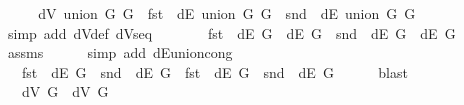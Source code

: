 \begin{isabellebody}
%
\isadelimproof
%
\endisadelimproof
%
\isatagproof
{}\isamarkupfalse%
\ {\isacharminus}{\kern0pt}\isanewline
\ \ \isamarkupfalse%
\ {\isachardoublequoteopen}dV\ {\isacharparenleft}{\kern0pt}union\ G{}\ G{}{\isacharparenright}{\kern0pt}\ {\isacharequal}{\kern0pt}\ fst\ {\isacharbackquote}{\kern0pt}\ dE\ {\isacharparenleft}{\kern0pt}union\ G{}\ G{}{\isacharparenright}{\kern0pt}\ {\isasymunion}\ snd\ {\isacharbackquote}{\kern0pt}\ dE\ {\isacharparenleft}{\kern0pt}union\ G{}\ G{}{\isacharparenright}{\kern0pt}{\isachardoublequoteclose}\isanewline
\ \ \ \ \isamarkupfalse%
\ {\isacharparenleft}{\kern0pt}simp\ add{\isacharcolon}{\kern0pt}\ dV{\isacharunderscore}{\kern0pt}def\ dVs{\isacharunderscore}{\kern0pt}eq{\isacharparenright}{\kern0pt}\isanewline
\ \ \isamarkupfalse%
\ \isamarkupfalse%
\ {\isachardoublequoteopen}{\isachardot}{\kern0pt}{\isachardot}{\kern0pt}{\isachardot}{\kern0pt}\ {\isacharequal}{\kern0pt}\ fst\ {\isacharbackquote}{\kern0pt}\ {\isacharparenleft}{\kern0pt}dE\ G{}\ {\isasymunion}\ dE\ G{}{\isacharparenright}{\kern0pt}\ {\isasymunion}\ snd\ {\isacharbackquote}{\kern0pt}\ {\isacharparenleft}{\kern0pt}dE\ G{}\ {\isasymunion}\ dE\ G{}{\isacharparenright}{\kern0pt}{\isachardoublequoteclose}\isanewline
\ \ \ \ \isamarkupfalse%
\ assms\isanewline
\ \ \ \ \isamarkupfalse%
\ {\isacharparenleft}{\kern0pt}simp\ add{\isacharcolon}{\kern0pt}\ dE{\isacharunderscore}{\kern0pt}union{\isacharunderscore}{\kern0pt}cong{\isacharparenright}{\kern0pt}\isanewline
\ \ \isamarkupfalse%
\ \isamarkupfalse%
\ {\isachardoublequoteopen}{\isachardot}{\kern0pt}{\isachardot}{\kern0pt}{\isachardot}{\kern0pt}\ {\isacharequal}{\kern0pt}\ {\isacharparenleft}{\kern0pt}fst\ {\isacharbackquote}{\kern0pt}\ dE\ G{}\ {\isasymunion}\ snd\ {\isacharbackquote}{\kern0pt}\ dE\ G{}{\isacharparenright}{\kern0pt}\ {\isasymunion}\ {\isacharparenleft}{\kern0pt}fst\ {\isacharbackquote}{\kern0pt}\ dE\ G{}\ {\isasymunion}\ snd\ {\isacharbackquote}{\kern0pt}\ dE\ G{}{\isacharparenright}{\kern0pt}{\isachardoublequoteclose}\isanewline
\ \ \ \ \isamarkupfalse%
\ blast\isanewline
\ \ \isamarkupfalse%
\ \isamarkupfalse%
\ {\isachardoublequoteopen}{\isachardot}{\kern0pt}{\isachardot}{\kern0pt}{\isachardot}{\kern0pt}\ {\isacharequal}{\kern0pt}\ dV\ G{}\ {\isasymunion}\ dV\ G{}{\isachardoublequoteclose}\isanewline

\end{isabellebody}
